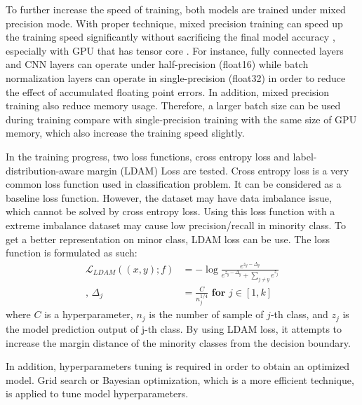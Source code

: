 \documentclass[10pt,twocolumn,letterpaper]{article}
\begin{document}
To further increase the speed of training, both models are trained under mixed precision mode. With proper technique, mixed precision training can speed up the training speed significantly without sacrificing the final model accuracy \cite{micikevicius_mixed_2017}, especially with GPU that has tensor core \cite{noauthor_training_nodate}. For instance, fully connected layers and CNN layers can operate under half-precision (float16) while batch normalization layers can operate in single-precision (float32) in order to reduce the effect of accumulated floating point errors. In addition, mixed precision training also reduce memory usage. Therefore, a larger batch size can be used during training compare with single-precision training with the same size of GPU memory, which also increase the training speed slightly.

In the training progress, two loss functions, cross entropy loss and label-distribution-aware margin (LDAM) Loss\cite{cao_learning_2019} are tested. Cross entropy loss is a very common loss function used in classification problem. It can be considered as a baseline loss function. However, the dataset may have data imbalance issue, which cannot be solved by cross entropy loss. Using this loss function with a extreme imbalance dataset may cause low precision/recall in minority class. To get a better representation on minor class, LDAM loss can be use. The loss function is formulated as such:
\begin{align}
    \mathcal{L}_{LDAM}((x, y); f) &= -\log{\frac{e^{z_y - \Delta_y}}{e^{z_y - \Delta_y} + \sum_{j \ne y}e^{z_j}}}\\
    \text{, }\Delta_j &= \frac{C}{n^{1/4}_j} \textbf{ for } j \in [1,k]
\end{align}
where $C$ is a hyperparameter, $n_j$ is the number of sample of $j$-th class, and $z_j$ is the model prediction output of j-th class. By using LDAM loss, it attempts to increase the margin distance of the minority classes from the decision boundary.

In addition, hyperparameters tuning is required in order to obtain an optimized model. Grid search or Bayesian optimization, which is a more efficient technique, is applied to tune model hyperparameters.

\end{document}
